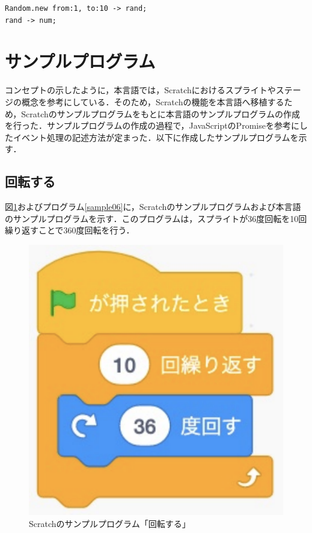 \documentclass[10pt,a4j]{ltjsarticle}
\begin{document}
\begin{lstlisting}[caption=乱数のプログラム例, label=code35]
Random.new from:1, to:10 -> rand;
rand -> num;
\end{lstlisting}
\clearpage

\section{サンプルプログラム}
コンセプトの示したように，本言語では，Scratchにおけるスプライトやステージの概念を参考にしている．そのため，Scratchの機能を本言語へ移植するため，Scratchのサンプルプログラムをもとに本言語のサンプルプログラムの作成を行った．サンプルプログラムの作成の過程で，JavaScriptのPromiseを参考にしたイベント処理の記述方法が定まった．以下に作成したサンプルプログラムを示す．

\subsection{回転する}
図\ref{fig:sample06}およびプログラム\ref{sample06}に，Scratchのサンプルプログラムおよび本言語のサンプルプログラムを示す．このプログラムは，スプライトが36度回転を10回繰り返すことで360度回転を行う．

\begin{figure}[H]
  \centering
  \includegraphics[scale=0.5]{images/sample06.pdf}
  \caption{Scratchのサンプルプログラム「回転する」}
  \label{fig:sample06}
\end{figure}
\end{document}
